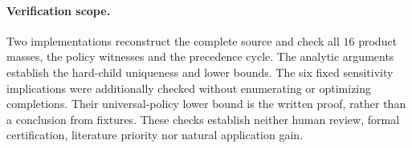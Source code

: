 \paragraph*{Verification scope.}
Two implementations reconstruct the complete source and check all
$16$ product masses, the policy witnesses and the precedence cycle.
The analytic arguments establish the hard-child uniqueness and lower
bounds. The six fixed sensitivity implications were additionally checked
without enumerating or optimizing completions. Their universal-policy
lower bound is the written proof, rather than a conclusion from fixtures.
These checks establish neither human review, formal certification,
literature priority nor natural application gain.
